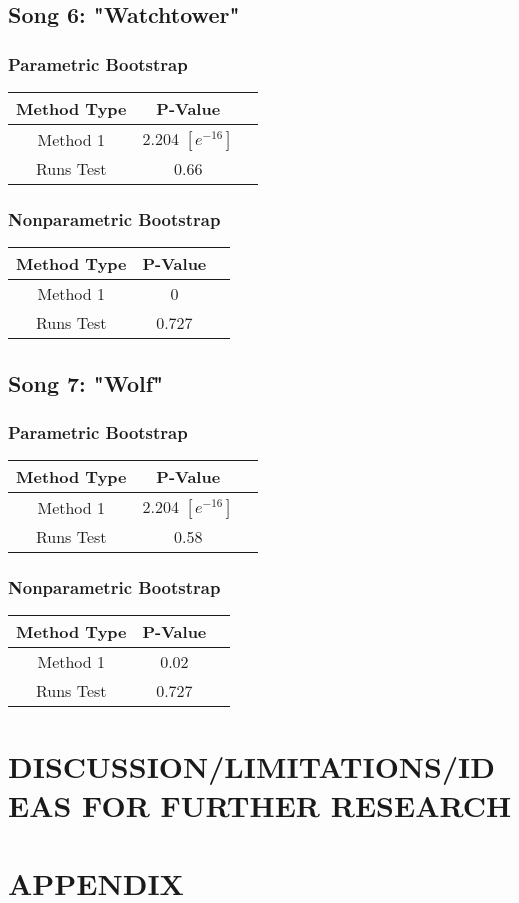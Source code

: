 \documentclass[12pt, letterpaper]{article}
\begin{document}
\subsection{Song 6: "Watchtower"}
\subsubsection{Parametric Bootstrap}

\begin{tabular}{|c|c|c|}
\hline
\textbf{Method Type} & P-Value  \\
\hline
Method 1 & 2.204 $[e^{-16}]$ \\
\hline
Runs Test & 0.66 \\ 
\hline
\end{tabular}

\subsubsection{Nonparametric Bootstrap}
\begin{tabular}{|c|c|c|}
\hline
\textbf{Method Type} & P-Value \\
\hline
Method 1 & 0  \\
\hline
Runs Test & 0.727 \\ 
\hline
\end{tabular}

\subsection{Song 7: "Wolf"}
\subsubsection{Parametric Bootstrap}

\begin{tabular}{|c|c|c|}
\hline
\textbf{Method Type} & P-Value  \\
\hline
Method 1 & 2.204 $[e^{-16}]$ \\
\hline
Runs Test & 0.58 \\ 
\hline
\end{tabular}

\subsubsection{Nonparametric Bootstrap}
\begin{tabular}{|c|c|c|}
\hline
\textbf{Method Type} & P-Value \\
\hline
Method 1 & 0.02  \\
\hline
Runs Test & 0.727 \\ 
\hline
\end{tabular}

\section{DISCUSSION/LIMITATIONS/IDEAS FOR FURTHER RESEARCH}


\section{APPENDIX}
\end{document}
